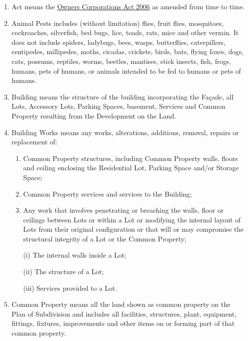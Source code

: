 \documentclass{article}
\begin{document}
\begin{enumerate}[label=\arabic*.]
\begin{enumerate}[label=\arabic{enumi}.\arabic*.]
\begin{enumerate}[label=(\arabic*)]
\item  Act means the \href{https://www.legislation.vic.gov.au/in-force/acts/owners-corporations-act-2006/017}{Owners Corporations Act 2006} as amended from time to time.
\item Animal Pests includes (without limitation) flies, fruit flies, mosquitoes, cockroaches, silverfish, bed bugs, lice, toads, rats, mice and other vermin. It does not include spiders, ladybugs, bees, wasps, butterflies, caterpillers, centipedes, millipedes, moths, cicadas, crickets, birds, bats, flying foxes, dogs, cats, possums, reptiles, worms, beetles, mantises, stick insects, fish, frogs, humans, pets of humans, or animals intended to be fed to humans or pets of humans.

\item  Building means the structure of the building incorporating the Façade, all Lots, Accessory Lots, Parking Spaces, basement, Services and Common Property resulting from the Development on the Land.

\item  Building Works means any works, alterations, additions, removal, repairs or replacement of:

\begin{enumerate}[label=(\alph*)]

\item  Common Property structures, including Common Property walls, floors and ceiling enclosing the Residential Lot, Parking Space and/or Storage Space;

\item  Common Property services and services to the Building;

\item  Any work that involves penetrating or breaching the walls, floor or ceilings between Lots or within a Lot or modifying the internal layout of Lots from their original configuration or that will or may compromise the structural integrity of a Lot or the Common Property;

(i) The internal walls inside a Lot;
\newpage



(ii) The structure of a Lot;

(iii) Services provided to a Lot.

\end{enumerate}

\item  Common Property means all the land shown as common property on the Plan of Subdivision and includes all facilities, structures, plant, equipment, fittings, fixtures, improvements and other items on or forming part of that common property.


\end{enumerate}
\end{enumerate}
\end{enumerate}
\end{document}
